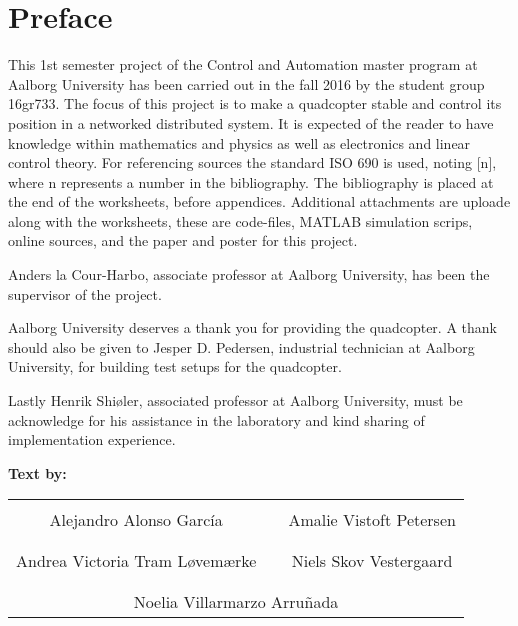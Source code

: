 
\chapter*{Preface}
This 1st semester project of the Control and Automation master program at Aalborg University has been carried out in the fall 2016 by the student group 16gr733. 
The focus of this project is to make a quadcopter stable and control its position in a networked distributed system. 
It is expected of the reader to have knowledge within mathematics and physics as well as electronics and linear control theory.
For referencing sources the standard ISO 690 is used, noting [n], where n represents a number in the bibliography. The bibliography is placed at the end of the worksheets, before appendices. Additional attachments are uploade along with the worksheets, these are code-files, MATLAB simulation scrips, online sources, and the paper and poster for this project.   

Anders la Cour-Harbo, associate professor at Aalborg University, has been the supervisor of the project. 

Aalborg University deserves a thank you for providing the quadcopter. A thank should also be given to Jesper D. Pedersen, industrial technician at Aalborg University, for building test setups for the quadcopter. 

Lastly Henrik Shiøler, associated professor at Aalborg University, must be acknowledge for his assistance in the laboratory and kind sharing of implementation experience.

\textbf{Text by:}\\
\vspace{-5pt}
\begin{table}[H]
	\centering
		\begin{tabular}{c c c}
			\underline{\phantom{JAERJAERJAERJAERGO}} & \phantom{cookies} & \underline{\phantom{JAERJAERJAERJAERGO}} \\
			Alejandro Alonso García			& \phantom{cookies} & Amalie Vistoft Petersen		\\
			&&\\
			\underline{\phantom{JAERJAERJAERJAERGO}} & \phantom{cookies} & \underline{\phantom{JAERJAERJAERJAERGO}} \\
			Andrea Victoria Tram Løvemærke			& \phantom{cookies} & Niels Skov Vestergaard		\\
			&&\\
	    \multicolumn{3}{c}{\underline{\phantom{JAERJAERJAERJAERGO}}}\\
	    \multicolumn{3}{c}{Noelia Villarmarzo Arruñada}\\				
		\end{tabular}
\end{table}

\pagebreak
\restoregeometry